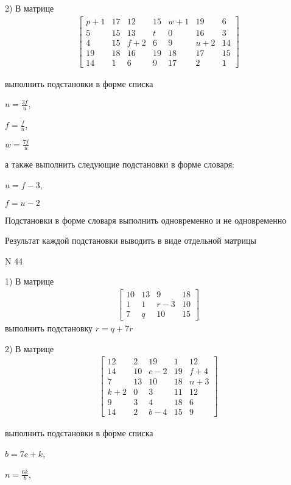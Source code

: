 \documentclass[11pt]{report}
\begin{document}
    2) В матрице
\begin{align*}
\left[\begin{matrix}p + 1 & 17 & 12 & 15 & w + 1 & 19 & 6\\5 & 15 & 13 & t & 0 & 16 & 3\\4 & 15 & f + 2 & 6 & 9 & u + 2 & 14\\19 & 18 & 16 & 19 & 18 & 17 & 15\\14 & 1 & 6 & 9 & 17 & 2 & 1\end{matrix}\right]
\end{align*}

выполнить подстановки в форме списка

$u=\frac{3 f}{u}$,

$f=\frac{f}{u}$,

$w=\frac{7 f}{u}$

а также выполнить следующие подстановки в форме словаря:

$u=f - 3$,

$f=u - 2$


    Подстановки в форме словаря выполнить одновременно и не одновременно


    Результат каждой подстановки выводить в виде отдельной матрицы

\newpage
N 44


    1) В матрице
\begin{align*}
\left[\begin{matrix}10 & 13 & 9 & 18\\1 & 1 & r - 3 & 10\\7 & q & 10 & 15\end{matrix}\right]
\end{align*}
выполнить подстановку $r=q + 7 r$


    2) В матрице
\begin{align*}
\left[\begin{matrix}12 & 2 & 19 & 1 & 12\\14 & 10 & c - 2 & 19 & f + 4\\7 & 13 & 10 & 18 & n + 3\\k + 2 & 0 & 3 & 11 & 12\\9 & 3 & 4 & 18 & 6\\14 & 2 & b - 4 & 15 & 9\end{matrix}\right]
\end{align*}

выполнить подстановки в форме списка

$b=7 c + k$,

$n=\frac{6 k}{b}$,
\end{document}
